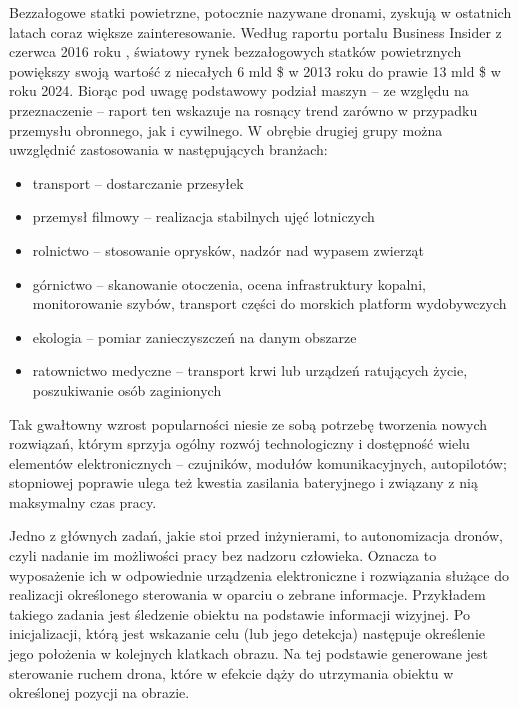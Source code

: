 Bezzałogowe statki powietrzne, potocznie nazywane dronami, zyskują w ostatnich latach coraz większe zainteresowanie. 
Według raportu portalu Business Insider z czerwca 2016 roku \cite{BInsider}, światowy rynek bezzałogowych statków powietrznych powiększy swoją wartość z niecałych 6 mld \$ w 2013 roku do prawie 13 mld \$ w roku 2024. 
Biorąc pod uwagę podstawowy podział maszyn -- ze względu na przeznaczenie -- raport ten wskazuje na rosnący trend zarówno w przypadku przemysłu obronnego, jak i cywilnego. W obrębie drugiej grupy można uwzględnić zastosowania w następujących branżach:
\begin{itemize}
	\item transport -- dostarczanie przesyłek
	\item przemysł filmowy -- realizacja stabilnych ujęć lotniczych
	\item rolnictwo -- stosowanie oprysków, nadzór nad wypasem zwierząt
	\item górnictwo -- skanowanie otoczenia, ocena infrastruktury kopalni, monitorowanie szybów, transport części do morskich platform wydobywczych
	\item ekologia -- pomiar zanieczyszczeń na danym obszarze
	\item ratownictwo medyczne -- transport krwi lub urządzeń ratujących życie, poszukiwanie osób zaginionych
\end{itemize}
Tak gwałtowny wzrost popularności niesie ze sobą potrzebę tworzenia nowych rozwiązań, którym sprzyja ogólny rozwój technologiczny i dostępność wielu elementów elektronicznych -- czujników, modułów komunikacyjnych, autopilotów; stopniowej poprawie ulega też kwestia zasilania bateryjnego i związany z nią maksymalny czas pracy. %

Jedno z głównych zadań, jakie stoi przed inżynierami, to autonomizacja dronów, czyli nadanie im możliwości pracy bez nadzoru człowieka.
Oznacza to wyposażenie ich w odpowiednie urządzenia elektroniczne i rozwiązania służące do realizacji określonego sterowania w oparciu o zebrane informacje. Przykładem takiego zadania jest śledzenie obiektu na podstawie informacji wizyjnej. Po inicjalizacji, którą jest wskazanie celu (lub jego detekcja) następuje określenie jego położenia w kolejnych klatkach obrazu. Na tej podstawie generowane jest sterowanie ruchem drona, które w efekcie dąży do utrzymania obiektu w określonej pozycji na obrazie.

